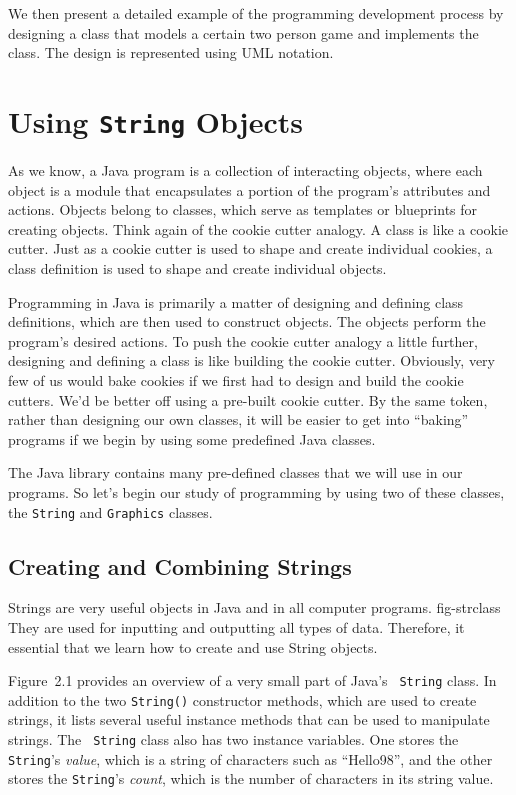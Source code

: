 We then present a detailed example of the programming development
process by designing a class that models a certain two person game
and implements the class.
The design is represented using UML notation.

\section{Using {\tt String} Objects}

\noindent As we know, a Java program is a collection of interacting
objects, where each object is a module that encapsulates a portion of
the program's attributes and actions. Objects belong to classes, which
serve as templates or blueprints for creating objects. Think again of
the cookie cutter analogy. A class is like a cookie cutter. Just as a
cookie cutter is used to shape and create individual cookies, a class
definition is used to shape and create individual objects.

Programming in Java is primarily a matter of designing and defining
class definitions, which are then used to construct objects. The
objects perform the program's desired actions. To push the cookie
cutter analogy a little further, designing and defining a class is
like building the cookie cutter.  Obviously, very few of us would bake
cookies if we first had to design and build the cookie cutters. We'd
be better off using a pre-built cookie cutter. By the same token,
rather than designing our own classes, it will be easier to get into
``baking'' programs if we begin by using some predefined Java classes.

The Java library contains many pre-defined classes that we will use in
our programs. So let's begin our study of programming by using two of
these classes, the {\tt String} and {\tt Graphics} classes.

\subsection{Creating and Combining Strings}

Strings are very useful objects in Java and in all computer programs.
{fig-strclass}
They are used for inputting and outputting all types of
data. Therefore, it essential that we learn how to create and use
String objects.

Figure~2.1 provides an overview of a very small part of Java's {\tt
String} class. In addition to the two {\tt String()} constructor
methods, which are used to create strings, it lists several useful
instance methods that can be used to manipulate strings. The {\tt
String} class also has two instance variables. One stores the {\tt
String}'s {\it value}, which is a string of characters such as
``Hello98'', and the other stores the {\tt String}'s {\it count},
which is the number of characters in its string value.

